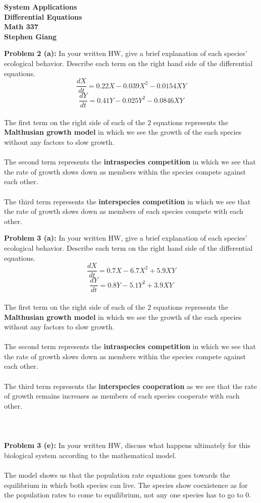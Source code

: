 \documentclass[12pt]{article}
\begin{document}
	
	\begin{center}
		\textbf{System Applications} \\
		\textbf{Differential Equations} \\
		\textbf{Math 337} \\
		\textbf{Stephen Giang} \\
	\end{center}

\noindent \textbf{Problem 2 (a): }In your written HW, give a brief explanation of each species' ecological behavior. Describe each term on the right hand side of the differential equations.
$$
\frac{dX}{dt} = 0.22X - 0.039X^2 - 0.0154XY
$$
$$
\frac{dY}{dt} = 0.41Y - 0.025Y^2 - 0.0846XY
$$
\\
\noindent 
The first term on the right side of each of the 2 equations represents the \textbf{Malthusian growth model} in which we see the growth of the each species without any factors to slow growth. 
\\ \\
The second term represents the \textbf{intraspecies competition} in which we see that the rate of growth slows down as members within the species compete against each other.
\\ \\
The third term represents the \textbf{interspecies competition} in which we see that the rate of growth slows down as members of each species compete with each other. 

\newpage 

\noindent \textbf{Problem 3 (a): }In your written HW, give a brief explanation of each species' ecological behavior. Describe each term on the right hand side of the differential equations.
$$
\frac{dX}{dt} = 0.7X - 6.7X^2 + 5.9XY
$$
$$
\frac{dY}{dt} = 0.8Y - 5.1Y^2 + 3.9XY
$$
\\
\noindent 
The first term on the right side of each of the 2 equations represents the \textbf{Malthusian growth model} in which we see the growth of the each species without any factors to slow growth. 
\\ \\
The second term represents the \textbf{intraspecies competition} in which we see that the rate of growth slows down as members within the species compete against each other.
\\ \\
The third term represents the \textbf{interspecies cooperation} as we see that the rate of growth remains increases as members of each species cooperate with each other.
\\ \\ \\ \\
\noindent \textbf{Problem 3 (e): }In your written HW, discuss what happens ultimately for this biological system according to the mathematical model.
\\ \\
The model shows us that the population rate equations goes towards the equilibrium in which both species can live. The species show coexistence as for the population rates to come to equilibrium, not any one species has to go to 0.
 
\end{document}
